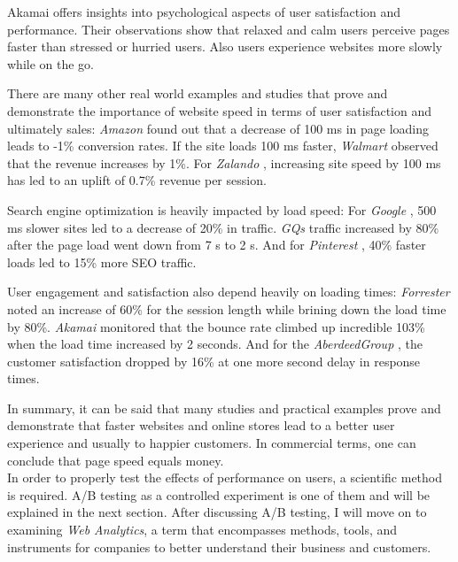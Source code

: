 
Akamai \cite{2014Akamai} offers insights into psychological aspects of user satisfaction and performance.
Their observations show that relaxed and calm users perceive pages faster than stressed or hurried users.
Also users experience websites more slowly while on the go.


There are many other real world examples and studies that prove and demonstrate the importance of website speed in terms of user satisfaction and ultimately sales:
\textit{Amazon} \cite{2006Linden} found out that a decrease of 100 ms in page loading leads to -1\% conversion rates.
If the site loads 100 ms faster, \textit{Walmart} \cite{2012Walmart} observed that the revenue increases by 1\%.
For \textit{Zalando} \cite{2018Zalando}, increasing site speed by 100 ms has led to an uplift of 0.7\% revenue per session.



Search engine optimization is heavily impacted by load speed:
For \textit{Google} \cite{2006Mayer}, 500 ms slower sites led to a decrease of 20\% in traffic.
\textit{GQs} \cite{2015GQ} traffic increased by 80\% after the page load went down from 7 s to 2 s.
And for \textit{Pinterest} \cite{2017Pinterest}, 40\% faster loads led to 15\% more SEO traffic.



User engagement and satisfaction also depend heavily on loading times:
\textit{Forrester} \cite{2017Forrester} noted an increase of 60\% for the session length while brining down the load time by 80\%.
\textit{Akamai} \cite{2017Akamai} monitored that the bounce rate climbed up incredible 103\% when the load time increased by 2 seconds.
And for the \textit{AberdeedGroup} \cite{2008Aberdeen}, the customer satisfaction dropped by 16\% at one more second delay in response times.

In summary, it can be said that many studies and practical examples prove and demonstrate that faster websites and online stores lead to a better user experience and usually to happier customers.
In commercial terms, one can conclude that page speed equals money.
\\

In order to properly test the effects of performance on users, a scientific method is required.
A/B testing as a controlled experiment is one of them and will be explained in the next section.
After discussing A/B testing, I will move on to examining \textit{Web Analytics}, a term that encompasses methods, tools, and instruments for companies to better understand their business and customers.


